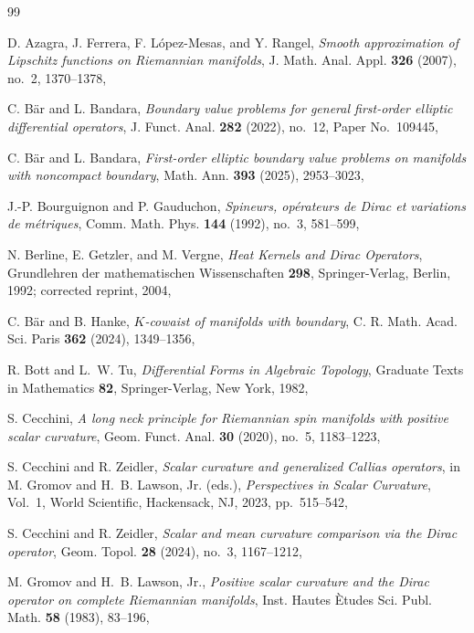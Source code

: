 \documentclass[12pt,reqno]{amsart}
\numberwithin{equation}{section}
\theoremstyle{definition}
\begin{document}
\begin{thebibliography}{99}

D. Azagra, J. Ferrera, F. L\'opez-Mesas, and Y. Rangel,
\emph{Smooth approximation of Lipschitz functions on Riemannian manifolds},
J. Math. Anal. Appl. \textbf{326} (2007), no.~2, 1370--1378,

C. B\"ar and L. Bandara,
\emph{Boundary value problems for general first-order elliptic differential
operators},
J. Funct. Anal. \textbf{282} (2022), no.~12, Paper No.~109445,

C. B\"ar and L. Bandara,
\emph{First-order elliptic boundary value problems on manifolds with
noncompact boundary},
Math. Ann. \textbf{393} (2025), 2953--3023,

J.-P. Bourguignon and P. Gauduchon,
\emph{Spineurs, op\'erateurs de Dirac et variations de m\'etriques},
Comm. Math. Phys. \textbf{144} (1992), no.~3, 581--599,

N. Berline, E. Getzler, and M. Vergne,
\emph{Heat Kernels and Dirac Operators},
Grundlehren der mathematischen Wissenschaften \textbf{298},
Springer-Verlag, Berlin, 1992; corrected reprint, 2004,

C. B\"ar and B. Hanke,
\emph{$K$-cowaist of manifolds with boundary},
C. R. Math. Acad. Sci. Paris \textbf{362} (2024), 1349--1356,

R. Bott and L.~W. Tu,
\emph{Differential Forms in Algebraic Topology},
Graduate Texts in Mathematics \textbf{82}, Springer-Verlag,
New York, 1982,

S. Cecchini,
\emph{A long neck principle for Riemannian spin manifolds with positive
scalar curvature},
Geom. Funct. Anal. \textbf{30} (2020), no.~5, 1183--1223,

S. Cecchini and R. Zeidler,
\emph{Scalar curvature and generalized Callias operators},
in M. Gromov and H.~B. Lawson, Jr. (eds.),
\emph{Perspectives in Scalar Curvature}, Vol.~1,
World Scientific, Hackensack, NJ, 2023, pp.~515--542,

S. Cecchini and R. Zeidler,
\emph{Scalar and mean curvature comparison via the Dirac operator},
Geom. Topol. \textbf{28} (2024), no.~3, 1167--1212,

M. Gromov and H.~B. Lawson, Jr.,
\emph{Positive scalar curvature and the Dirac operator on complete
Riemannian manifolds},
Inst. Hautes \`Etudes Sci. Publ. Math. \textbf{58} (1983), 83--196,



\end{thebibliography}
\end{document}
